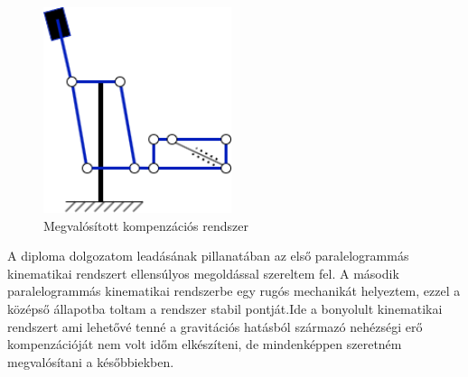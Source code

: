 \begin{figure}[!ht]
\centering
\includegraphics[width=55mm, keepaspectratio]{figures/Diagrammok/Megvalositott_kompenzacio}
\caption{Megvalósított kompenzációs rendszer}
\label{fig:Megvalositott_kompenzacio}
\end{figure}


A diploma dolgozatom leadásának pillanatában az első paralelogrammás kinematikai rendszert ellensúlyos megoldással szereltem fel. A második paralelogrammás kinematikai rendszerbe egy rugós mechanikát helyeztem, ezzel a középső állapotba toltam a rendszer stabil pontját.Ide a bonyolult kinematikai rendszert ami lehetővé tenné a gravitációs hatásból származó nehézségi erő kompenzációját nem volt időm elkészíteni, de mindenképpen szeretném megvalósítani a későbbiekben.
